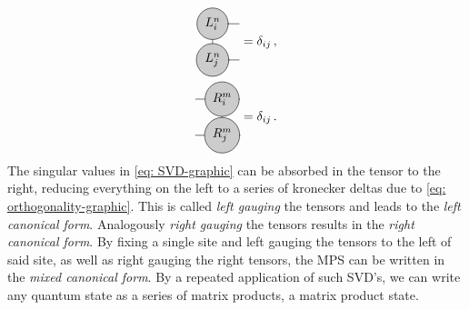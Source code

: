 \documentclass[twoside,twocolumn,9pt]{article}
\begin{document}
\begin{align} \label{eq: orthogonality-graphic}
  \begin{split}
    \begin{tikzpicture}[baseline={([yshift=-.5ex]current bounding box.center)}]
      \draw[gray, thick] (0,0) -- (0,-1);
      \draw[gray, thick] (0,0) -- (0.75,0);
      \draw[gray, thick] (0,-1) -- (0.75,-1);
      \node[draw, circle, line cap=round, fill=black!20, minimum size=12] at (0,0) {$L_i^n$};
      \node[draw, circle, line cap=round, fill=black!20, minimum size=12] at (0,-1) {$L_j^n$};
    \end{tikzpicture} &= \delta_{ij} \thinspace ,\\
    \begin{tikzpicture}[baseline={([yshift=-.5ex]current bounding box.center)}]
      \draw[gray, thick] (0,0) -- (0,-1);
      \draw[gray, thick] (0,0) -- (-0.75,0);
      \draw[gray, thick] (0,-1) -- (-0.75,-1);
      \node[draw, circle, line cap=round, fill=black!20, minimum size=12] at (0,0) {$R_i^m$};
      \node[draw, circle, line cap=round, fill=black!20, minimum size=12] at (0,-1) {$R_j^m$};
    \end{tikzpicture} &= \delta_{ij} \thinspace .
  \end{split}
\end{align}
The singular values in \cref{eq: SVD-graphic} can be absorbed in the tensor to the right, reducing everything on the left to a series of kronecker deltas due to \cref{eq: orthogonality-graphic}. This is called \emph{left gauging} the tensors and leads to the \emph{left canonical form}. Analogously \emph{right gauging} the tensors results in the \emph{right canonical form}. By fixing a single site and left gauging the tensors to the left of said site, as well as right gauging the right tensors, the MPS can be written in the \emph{mixed canonical form}. By a repeated application of such SVD's, we can write any quantum state as a series of matrix products, a matrix product state.
\end{document}
